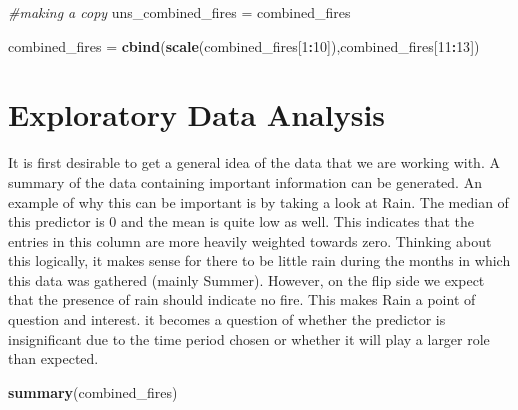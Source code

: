 \documentclass[
]{article}
\newenvironment{Shaded}{\begin{snugshade}}{\end{snugshade}}
\newcommand{\CommentTok}[1]{\textcolor[rgb]{0.56,0.35,0.01}{\textit{#1}}}
\newcommand{\DecValTok}[1]{\textcolor[rgb]{0.00,0.00,0.81}{#1}}
\newcommand{\FunctionTok}[1]{\textcolor[rgb]{0.13,0.29,0.53}{\textbf{#1}}}
\newcommand{\NormalTok}[1]{#1}
\newcommand{\OtherTok}[1]{\textcolor[rgb]{0.56,0.35,0.01}{#1}}
\newcommand{\SpecialCharTok}[1]{\textcolor[rgb]{0.81,0.36,0.00}{\textbf{#1}}}
\begin{document}
\begin{Shaded}
\begin{Highlighting}[]
\CommentTok{\#making a copy}
\NormalTok{uns\_combined\_fires }\OtherTok{=}\NormalTok{ combined\_fires}

\NormalTok{combined\_fires }\OtherTok{=} \FunctionTok{cbind}\NormalTok{(}\FunctionTok{scale}\NormalTok{(combined\_fires[}\DecValTok{1}\SpecialCharTok{:}\DecValTok{10}\NormalTok{]),combined\_fires[}\DecValTok{11}\SpecialCharTok{:}\DecValTok{13}\NormalTok{])}
\end{Highlighting}
\end{Shaded}

\section{Exploratory Data Analysis}\label{exploratory-data-analysis}

It is first desirable to get a general idea of the data that we are
working with. A summary of the data containing important information can
be generated. An example of why this can be important is by taking a
look at Rain. The median of this predictor is 0 and the mean is quite
low as well. This indicates that the entries in this column are more
heavily weighted towards zero. Thinking about this logically, it makes
sense for there to be little rain during the months in which this data
was gathered (mainly Summer). However, on the flip side we expect that
the presence of rain should indicate no fire. This makes Rain a point of
question and interest. it becomes a question of whether the predictor is
insignificant due to the time period chosen or whether it will play a
larger role than expected.

\begin{Shaded}
\begin{Highlighting}[]
\FunctionTok{summary}\NormalTok{(combined\_fires)}
\end{Highlighting}
\end{Shaded}
\end{document}
